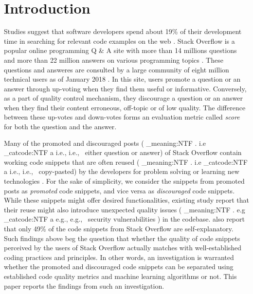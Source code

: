 \documentclass[conference]{IEEEtran}
\makeatletter
\newcommand\latinabbrev[1]{
  \peek_meaning:NTF . {%
    #1\@}%
  { \peek_catcode:NTF a {%
      #1., \@ }%
    {#1., \@}}}
\def\eg{\latinabbrev{e.g}}
\def\ie{\latinabbrev{i.e}}
\makeatother
\begin{document}
\IEEEpeerreviewmaketitle


\section{Introduction}
Studies suggest that software developers spend about 19\% of their development time in searching for relevant code examples on the web \cite{twostudy,koderlog}. Stack Overflow is a popular online programming Q \& A site with more than 14 millions questions and more than 22 million answers on various programming topics \cite{nlp2code}. These questions and answeres are consulted by a large community of eight million technical users as of January 2018 \cite{sowiki}. In this site, users promote a question or an answer through up-voting when they find them useful or informative. Conversely, as a part of quality control mechanism, they discourage a question or an answer when they find their content erroneous, off-topic or of low quality. The difference between these up-votes and down-votes forms an evaluation metric called \emph{score} for both the question and the answer.

Many of the promoted and discouraged posts (\ie\ either question or answer) of Stack Overflow contain working code snippets that are often reused (\ie\ copy-pasted) by the developers for problem solving or learning new technologies \cite{rabe}. For the sake of simplicity, we consider the snippets from promoted posts as \emph{promoted} code snippets, and vice versa as \emph{discouraged} code snippets. While these snippets might offer desired functionalities, existing study report that their reuse might also introduce unexpected quality issues (\eg\ security vulnerabilities \cite{security}) in the codebase. \citet{understanding} also report that only 49\% of the code snippets from Stack Overflow are self-explanatory. 
Such findings above beg the question that whether the quality of code snippets perceived by the users of Stack Overflow actually matches with well-established coding practices and principles. In other words, an investigation is warranted whether the promoted and discouraged code snippets can be separated using established code quality metrics and machine learning algorithms or not. This paper reports the findings from such an investigation.
\end{document}
